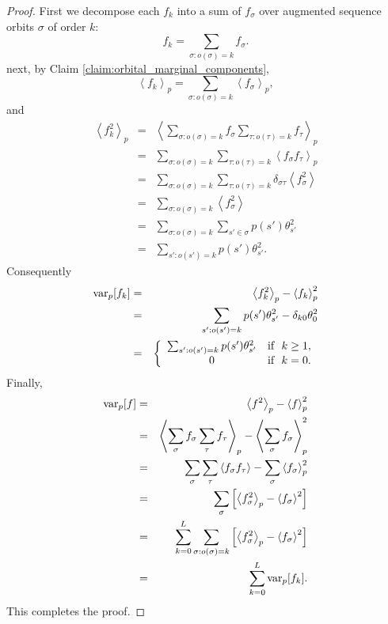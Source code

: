 \documentclass{article}
\numberwithin{myclaim}{section}
\newcommand{\var}{{\rm var}}
\newcommand{\braket}[1]{\left\langle #1 \right\rangle}
\begin{document}
\begin{proof}
First we decompose each $f_k$ into a sum of $f_\sigma$ over augmented sequence orbits $\sigma$ of order $k$:
\begin{equation}
	f_k = \sum_{\sigma: o(\sigma)=k} f_\sigma .
\end{equation}
next, by Claim \ref{claim:orbital_marginal_components},
\begin{equation}
	\braket{f_k}_p = \sum_{\sigma: o(\sigma)=k} \braket{f_\sigma}_p,
\end{equation}
and
\begin{eqnarray}
\braket{f^2_k}_p 
	&=& \braket{ \sum_{\sigma: o(\sigma)=k} f_\sigma \sum_{\tau: o(\tau)=k} f_\tau }_p \\
	&=& \sum_{\sigma: o(\sigma)=k} \sum_{\tau: o(\tau)=k} \braket{f_\sigma f_\tau }_p \\
	&=& \sum_{\sigma: o(\sigma)=k} \sum_{\tau: o(\tau)=k} \delta_{\sigma \tau} \braket{f^2_\sigma} \\
	&=& \sum_{\sigma: o(\sigma)=k} \braket{f^2_\sigma} \\
	&=& \sum_{\sigma: o(\sigma)=k} \sum_{s' \in \sigma} p(s') \theta^2_{s'} \\
	&=& \sum_{s': o(s')=k} p(s') \theta^2_{s'}.
\end{eqnarray}
Consequently
\begin{eqnarray}
\var_p[f_k]
	&=& \braket{f^2_k}_p - \braket{f_k}^2_p \\
	&=& \sum_{s': o(s')=k} p(s') \theta^2_{s'} - \delta_{k0} \theta_0^2	\\
	&=& \left\{ 
		\begin{array}{cl}
			\sum_{s': o(s')=k} p(s') \theta^2_{s'} & \textrm{if}~~k \ge 1, \\
			0 & \textrm{if}~~k=0.
		\end{array} \right.
\end{eqnarray}
Finally,
\begin{eqnarray}
\var_p[f] 
	&=& \braket{f^2}_p - \braket{f}^2_p \\
	&=& \braket{\sum_\sigma f_\sigma \sum_\tau f_\tau}_p - \braket{\sum_\sigma f_\sigma }^2_p \\
	&=& \sum_\sigma \sum_\tau \braket{f_\sigma f_\tau} - \sum_\sigma \braket{f_\sigma}^2_p \\
	&=& \sum_\sigma \left[ \braket{f^2_\sigma}_p  - \braket{f_\sigma}^2 \right] \\
	&=& \sum_{k=0}^L \sum_{\sigma:o(\sigma)=k} \left[ \braket{f^2_\sigma}_p  - \braket{f_\sigma}^2 \right] \\
	&=& \sum_{k=0}^L \var_p[f_k].
\end{eqnarray}
This completes the proof.
\end{proof}
\end{document}
